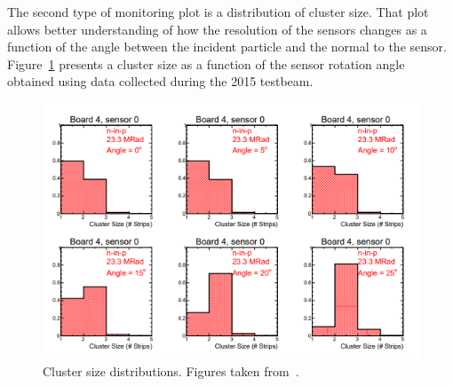 The second type of monitoring plot is a distribution of cluster size. That plot allows better understanding of how the resolution of the sensors changes as a function of the angle between the incident particle and the normal to the sensor. Figure~\ref{fig:clusters_size} presents a cluster size as a function of the sensor rotation angle obtained using data collected during the 2015 testbeam. 


\begin{figure}
\centering
\includegraphics{figures/Cluster_size.PNG}
\caption{Cluster size distributions. Figures taken from~\cite{tb1}. 
}\label{fig:clusters_size}
\end{figure}

 